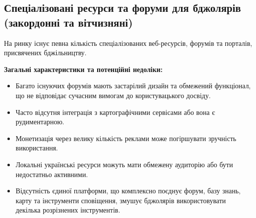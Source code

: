 \subsection{Спеціалізовані ресурси та форуми для бджолярів (закордонні та вітчизняні)}
На ринку існує певна кількість спеціалізованих веб-ресурсів, форумів та порталів, присвячених бджільництву. 

\textbf{Загальні характеристики та потенційні недоліки:}
\begin{itemize}
    \item Багато існуючих форумів мають застарілий дизайн та обмежений функціонал, що не відповідає сучасним вимогам до користувацького досвіду.
    \item Часто відсутня інтеграція з картографічними сервісами або вона є рудиментарною.
    \item Монетизація через велику кількість реклами може погіршувати зручність використання.
    \item Локальні українські ресурси можуть мати обмежену аудиторію або бути недостатньо активними.
    \item Відсутність єдиної платформи, що комплексно поєднує форум, базу знань, карту та інструменти сповіщення, змушує бджолярів використовувати декілька розрізнених інструментів.
\end{itemize}

